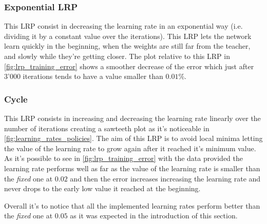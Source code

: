 \subsubsection{Exponential LRP}
This LRP consist in decreasing the learning rate in an exponential way (i.e. dividing it by a constant value over the iterations). This
LRP lets the network learn quickly in the beginning, when the weights are still far from the teacher, and slowly while they're getting closer. The plot
relative to this LRP in \cref{fig:lrp_training_error} shows a smoother decrease of the error which just after 3'000 iterations tends to have a value
smaller than $0.01\%$.

\subsubsection{Cycle}
This LRP consists in increasing and decreasing the learning rate linearly over the number of iterations creating a sawteeth plot as it's noticeable
in \cref{fig:learning_rates_policies}. The aim of this LRP is to avoid local minima letting the value of the learning rate to grow again after it
reached it's minimum value. As it's possible to see in \cref{fig:lrp_training_error} with the data provided the learning rate performs well as far
as the value of the learning rate is smaller than the \textit{fixed} one at $0.02$ and then the error increases increasing the learning rate and never
drops to the early low value it reached at the beginning.

Overall it's to notice that all the implemented learning rates perform better than the \textit{fixed} one at $0.05$ as it was expected in the introduction of this section.